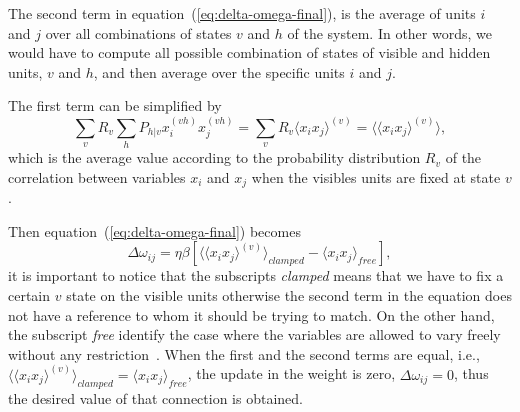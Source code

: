 The second term in equation~(\ref{eq:delta-omega-final}), is the average of units $i$ and $j$ over all combinations of states $v$ and $h$ of the system.
In other words, we would have to compute all possible combination of states of visible and hidden units, $v$ and $h$, and then average over the specific units $i$ and $j$.

The first term can be simplified by
\begin{equation}
  \label{eq:clamped-term}
  \sum_{v} R_{v} \sum_{h} P_{h|v} x^{(vh)}_{i} x^{(vh)}_{j} = \sum_{v} R_{v} \langle x_{i} x_{j} \rangle^{(v)} = \langle \langle x_{i} x_{j} \rangle^{(v)} \rangle,
\end{equation}
which is the average value according to the probability distribution $R_{v}$ of the correlation between variables $x_{i}$ and $x_{j}$ when the visibles units are fixed at state $v$.

Then equation~(\ref{eq:delta-omega-final}) becomes
\begin{equation}
  \label{eq:delta-omega-final2}
  \Delta \omega_{ij} = \eta \beta \left[ \langle \langle x_{i} x_{j} \rangle^{(v)} \rangle_{clamped} - \langle x_{i} x_{j} \rangle_{free} \right],
\end{equation}
it is important to notice that the subscripts \textit{clamped} means that we have to fix a certain $v$ state on the visible units otherwise the second term in the equation does not have a reference to whom it should be trying to match.
On the other hand, the subscript \textit{free} identify the case where the variables are allowed to vary freely without any restriction~\cite{bib:duda2000}. When the first and the second terms are equal, i.e., $\langle \langle x_{i} x_{j} \rangle^{(v)} \rangle_{clamped} = \langle x_{i} x_{j} \rangle_{free}$, the update in the weight is zero, $\Delta \omega_{ij} = 0$, thus the desired value of that connection is obtained.
